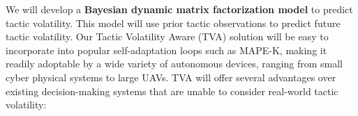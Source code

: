 \documentclass{article}
\newcommand{\dan}[1]{\textcolor{blue}{{\it [Dan says: #1]}}}
\begin{document}




We will develop a {\bf Bayesian dynamic matrix factorization model} to predict tactic volatility. This model will use prior tactic observations to predict future tactic volatility. Our Tactic Volatility Aware (TVA) solution will be easy to incorporate into popular self-adaptation loops such as MAPE-K, making it readily adoptable by a wide variety of autonomous devices, ranging from small cyber physical systems to large UAVs. TVA will offer several advantages over existing decision-making systems that are unable to consider real-world tactic volatility:


\end{document}
